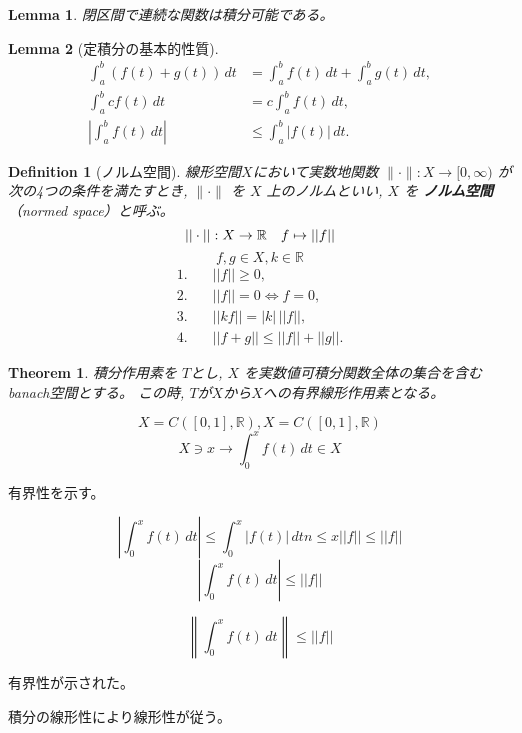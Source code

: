 \documentclass[a4paper]{article}
\newtheorem{Lemma}{Lemma}       %
\newtheorem{Definition}{Definition}   %
\newtheorem{Theorem}{Theorem}   %
\begin{document}
\begin{Lemma}
    閉区間で連続な関数は積分可能である。
\end{Lemma}
\begin{Lemma}[定積分の基本的性質]
    \begin{align}
        \displaystyle \int_{a}^{b} (f(t) + g(t)) \, dt &= \displaystyle \int_{a}^{b} f(t) \, dt + \displaystyle \int_{a}^{b} g(t) \, dt, \\
        \displaystyle \int_{a}^{b} c f(t) \, dt &= c \displaystyle \int_{a}^{b} f(t) \, dt, \\
        \displaystyle \left| \int_{a}^{b} f(t) \, dt \right| &\leq \displaystyle \int_{a}^{b} |f(t)| \, dt.
    \end{align}
\end{Lemma}

\begin{Definition}[ノルム空間]
    線形空間$X$において実数地関数 $\|\cdot\|: X \to [0, \infty)$ が次の4つの条件を満たすとき, $\|\cdot\|$ を $X$ 上のノルムといい, $X$ を \textbf{ノルム空間}（normed space）と呼ぶ。
    \[
    ||\cdot|| : X \to \mathbb{R}\\ \quad f \mapsto ||f|| 
    \]
    \[f,g \in X,k \in \mathbb{R}\]
    \begin{align}
    1. \quad & ||f|| \geq 0, \\
    2. \quad & ||f|| = 0 \Leftrightarrow f = 0, \\
    3. \quad & ||kf|| = |k| \, ||f||, \\
    4. \quad & ||f+g|| \leq ||f|| + ||g||.
    \end{align}
\end{Definition}

\begin{Theorem}
    積分作用素を $T$とし, $X$ を実数値可積分関数全体の集合を含むbanach空間とする。
    この時, $T$が$X$から$X$への有界線形作用素となる。
\end{Theorem}
\[X=C([0,1],\mathbb{R}),X=C([0,1],\mathbb{R})\]
\[X \ni x \to \int_0^x f(t) \, dt \in X \]

有界性を示す。

\[\displaystyle \left|\int_0^x f(t) \, dt \right| \leq \displaystyle \int_0^x |f(t)| \, dtn \leq x||f|| \leq ||f||\]
\[\displaystyle \left|\int_0^x f(t) \, dt \right| \leq  ||f|| \]

\[\displaystyle 
\left\| \int_0^x f(t) \, dt \right\|  \leq ||f||
\]

有界性が示された。

積分の線形性により線形性が従う。
\end{document}
